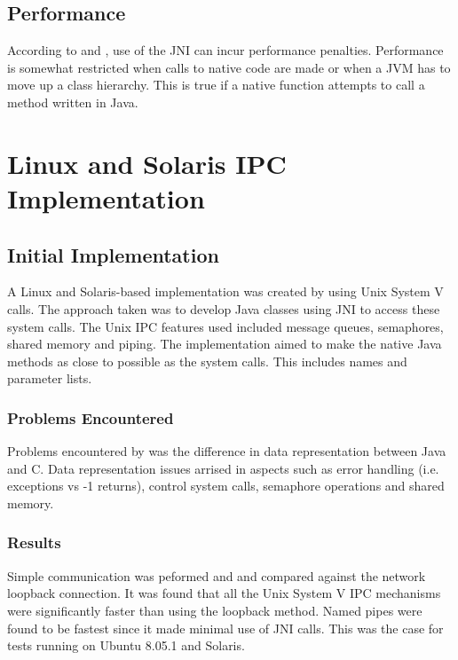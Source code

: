 \documentclass[12pt] {newrucsthesis}    %
\begin{document}
      \subsection{Performance}
        According to \cite{IBM2009} and \cite{WellsIPCMultiProc}, use of the JNI can incur
        performance penalties. Performance is somewhat restricted when calls to native code
        are made or when a JVM has to move up a class hierarchy. This is true if a native function
        attempts to call a method written in Java.

    \section{Linux and Solaris IPC Implementation}
      \subsection{Initial Implementation}
        A Linux and Solaris-based
        implementation was created by \cite{WellsIPCMultiProc} using Unix
        System V calls. The approach taken was to develop Java classes using JNI
        to access these system calls. The Unix IPC features used included
        message queues, semaphores, shared memory and piping. The
        implementation aimed to make the native Java methods as close to
        possible as the system calls. This includes names and parameter lists.

      \subsubsection{Problems Encountered}
        Problems encountered by \cite{WellsIPCMultiProc} was the
        difference in data representation between Java and C. Data representation
        issues arrised in aspects such as error handling (i.e. exceptions vs -1
        returns), control system calls, semaphore operations and shared memory.

      \subsubsection{Results}
        Simple communication was peformed and and
        compared against the network loopback connection. It was found that all
        the Unix System V IPC mechanisms were significantly faster than using the
        loopback method. Named pipes were found to be fastest since it made
        minimal use of JNI calls. This was the case for tests running on Ubuntu
        8.05.1 and Solaris.
\end{document}
